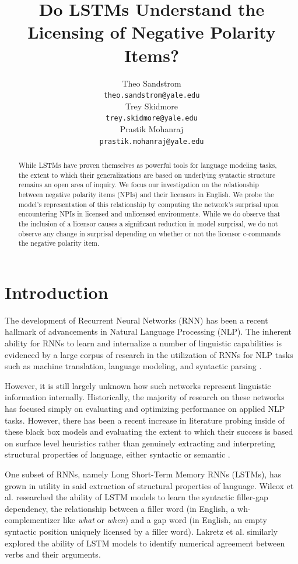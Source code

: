 \documentclass[11pt, round]{article}
\title{Do LSTMs Understand the Licensing of Negative Polarity Items?}
\author{Theo Sandstrom \\
  \texttt{theo.sandstrom@yale.edu} \\
  Trey Skidmore \\
  \texttt{trey.skidmore@yale.edu} \\
  Prastik Mohanraj \\
  \texttt{prastik.mohanraj@yale.edu}}
\begin{document}
\maketitle

\begin{abstract}
While LSTMs have proven themselves as powerful tools for language modeling tasks, the extent to which their generalizations are based on underlying syntactic structure remains an open area of inquiry. We focus our investigation on the relationship between negative polarity items (NPIs) and their licensors in English. We probe the model's representation of this relationship by computing the network's surprisal upon encountering NPIs in licensed and unlicensed environments. While we do observe that the inclusion of a licensor causes a significant reduction in model surprisal, we do not observe any change in surprisal depending on whether or not the licensor c-commands the negative polarity item. 
\end{abstract}

\section{Introduction}

The development of Recurrent Neural Networks (RNN) has been a recent hallmark of advancements in Natural Language Processing (NLP). The inherent ability for RNNs to learn and internalize a number of linguistic capabilities is evidenced by a large corpus of research in the utilization of RNNs for NLP tasks such as machine translation, language modeling, and syntactic parsing \cite{wilcox-etal-2018-rnn,gulordava2018colorless,jozefowicz2016exploring}. 

However, it is still largely unknown how such networks represent linguistic information internally. Historically, the majority of research on these networks has focused simply on evaluating and optimizing performance on applied NLP tasks. However, there has been a recent increase in literature probing inside of these black box models and evaluating the extent to which their success is based on surface level heuristics rather than genuinely extracting and interpreting structural properties of language, either syntactic or semantic \cite{lakretz2019emergence}.

One subset of RNNs, namely Long Short-Term Memory RNNs (LSTMs), has grown in utility in said extraction of structural properties of language. Wilcox et al.  researched the ability of LSTM models to learn the syntactic filler-gap dependency, the relationship between a filler word (in English, a wh- complementizer like \textit{what} or \textit{when}) and a gap word (in English, an empty syntactic position uniquely licensed by a filler word). Lakretz et al.  similarly explored the ability of LSTM models to identify numerical agreement between verbs and their arguments. 
\end{document}
